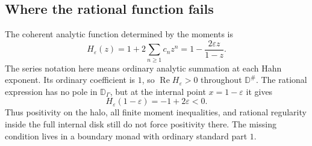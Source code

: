 \documentclass[11pt,letterpaper]{article}
\theoremstyle{definition}
\newcommand{\D}{\mathbb D}\newcommand{\No}{\mathbf{No}}
\newcommand{\Rea}{\operatorname{Re}}
\newcommand{\eps}{\varepsilon}
\newcommand{\halo}[1]{#1^{\#}}
\numberwithin{equation}{section}
\begin{document}
\subsection{Where the rational function fails}

The coherent analytic function determined by the moments is
\begin{equation}\label{herg:eq:badH}
 H_\eps(z)=1+2\sum_{n\ge1}c_nz^n
 =1-\frac{2\eps z}{1-z}.
\end{equation}
The series notation here means ordinary analytic summation at each Hahn exponent. Its ordinary coefficient is $1$, so $\Rea H_\eps>0$ throughout $\halo\D$. The rational expression has no pole in $\D_\Gamma$, but at the internal point $x=1-\eps$ it gives
\begin{equation}\label{herg:eq:boundarynegative}
 H_\eps(1-\eps)=-1+2\eps<0.
\end{equation}
Thus positivity on the halo, all finite moment inequalities, and rational regularity inside the full internal disk still do not force positivity there. The missing condition lives in a boundary monad with ordinary standard part $1$.
\end{document}
